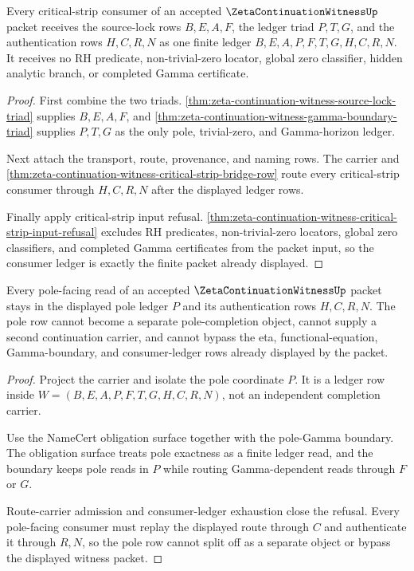 \begin{theorem}
\label{thm:zeta-continuation-witness-critical-strip-ledger-triad}
Every critical-strip consumer of an accepted $\ZetaContinuationWitnessUp$ packet receives the source-lock rows $B,E,A,F$, the ledger triad $P,T,G$, and the authentication rows $H,C,R,N$ as one finite ledger $B,E,A,P,F,T,G,H,C,R,N$. It receives no RH predicate, non-trivial-zero locator, global zero classifier, hidden analytic branch, or completed Gamma certificate.
\end{theorem}
\begin{proof}
First combine the two triads. \autoref{thm:zeta-continuation-witness-source-lock-triad} supplies $B,E,A,F$, and \autoref{thm:zeta-continuation-witness-gamma-boundary-triad} supplies $P,T,G$ as the only pole, trivial-zero, and Gamma-horizon ledger.

Next attach the transport, route, provenance, and naming rows. The carrier and \autoref{thm:zeta-continuation-witness-critical-strip-bridge-row} route every critical-strip consumer through $H,C,R,N$ after the displayed ledger rows.

Finally apply critical-strip input refusal. \autoref{thm:zeta-continuation-witness-critical-strip-input-refusal} excludes RH predicates, non-trivial-zero locators, global zero classifiers, and completed Gamma certificates from the packet input, so the consumer ledger is exactly the finite packet already displayed.
\end{proof}

\begin{theorem}
\label{thm:zeta-continuation-witness-pole-ledger-refusal-row}
Every pole-facing read of an accepted $\ZetaContinuationWitnessUp$ packet stays in the displayed pole ledger $P$ and its authentication rows $H,C,R,N$. The pole row cannot become a separate pole-completion object, cannot supply a second continuation carrier, and cannot bypass the eta, functional-equation, Gamma-boundary, and consumer-ledger rows already displayed by the packet.
\end{theorem}
\begin{proof}
Project the carrier and isolate the pole coordinate $P$. It is a ledger row inside $W=(B,E,A,P,F,T,G,H,C,R,N)$, not an independent completion carrier.

Use the NameCert obligation surface together with the pole-Gamma boundary. The obligation surface treats pole exactness as a finite ledger read, and the boundary keeps pole reads in $P$ while routing Gamma-dependent reads through $F$ or $G$.

Route-carrier admission and consumer-ledger exhaustion close the refusal. Every pole-facing consumer must replay the displayed route through $C$ and authenticate it through $R,N$, so the pole row cannot split off as a separate object or bypass the displayed witness packet.
\end{proof}

